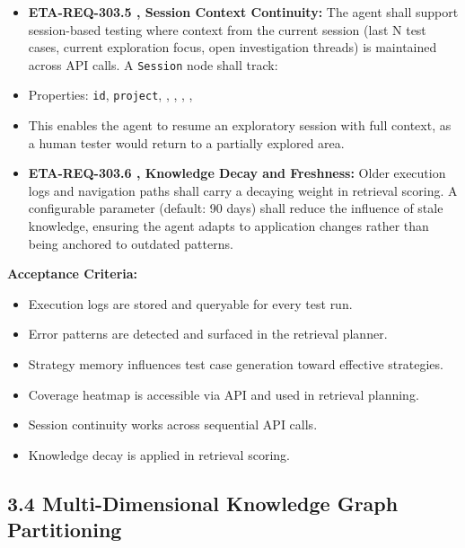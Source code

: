 \begin{itemize}[leftmargin=1.4em,itemsep=1pt,topsep=3pt]
  \item \textbf{ETA-REQ-303.5 ,  Session Context Continuity:} The agent shall support session-based testing where context from the current session (last N test cases, current exploration focus, open investigation threads) is maintained across API calls. A \texttt{Session} node shall track:
  \item Properties: \texttt{id}, \texttt{project}, , , , , 
  \item This enables the agent to resume an exploratory session with full context, as a human tester would return to a partially explored area.
\end{itemize}

\begin{itemize}[leftmargin=1.4em,itemsep=1pt,topsep=3pt]
  \item \textbf{ETA-REQ-303.6 ,  Knowledge Decay and Freshness:} Older execution logs and navigation paths shall carry a decaying weight in retrieval scoring. A configurable  parameter (default: 90 days) shall reduce the influence of stale knowledge, ensuring the agent adapts to application changes rather than being anchored to outdated patterns.
\end{itemize}

\textbf{Acceptance Criteria:}
\begin{itemize}[leftmargin=1.4em,itemsep=1pt,topsep=3pt]
  \item Execution logs are stored and queryable for every test run.
  \item Error patterns are detected and surfaced in the retrieval planner.
  \item Strategy memory influences test case generation toward effective strategies.
  \item Coverage heatmap is accessible via API and used in retrieval planning.
  \item Session continuity works across sequential API calls.
  \item Knowledge decay is applied in retrieval scoring.
\end{itemize}

\subsection*{3.4 Multi-Dimensional Knowledge Graph Partitioning}

